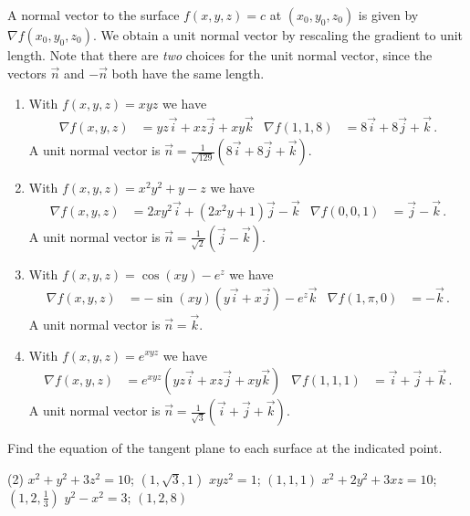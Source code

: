 \begin{solution}
A normal vector to the surface $f(x,y,z)=c$ at $(x_0,y_0,z_0)$ is given by $\nabla f(x_0,y_0,z_0)$. We obtain a unit normal vector by rescaling the gradient to unit length. Note that there are \emph{two} choices for the unit normal vector, since the vectors $\vec n$ and $-\vec n$ both have the same length.
\begin{enumerate}
\item
With $f(x,y,z) = xyz$ we have
\begin{align*}
\nabla f(x,y,z) &= yz \vec i + xz \vec j + xy \vec k &
\nabla f(1,1,8) &= 8\vec i + 8 \vec j + \vec k\,.
\end{align*}
A unit normal vector is
$\vec n = \frac{1}{\sqrt {129}} \left( 8\vec i + 8 \vec j + \vec k \right)$.

\item
With $f(x,y,z) = x^2y^2 + y -z$ we have
\begin{align*}
\nabla f(x,y,z) &= 2xy^2 \vec i + (2x^2 y + 1) \vec j - \vec k &
\nabla f(0,0,1) &= \vec j - \vec k\,.
\end{align*}
A unit normal vector is 
$\vec n = \frac{1}{\sqrt 2} \left( \vec j - \vec k \right)$.

\item
With $f(x,y,z) = \cos(xy) - e^z$ we have
\begin{align*}
\nabla f(x,y,z) &= -\sin(xy) \left(y \vec i + x \vec j\right) - e^z \vec k &
\nabla f(1,\pi,0) &= -\vec k\,.
\end{align*}
A unit normal vector is $\vec n = \vec k$.

\item
With $f(x,y,z) = e^{xyz}$ we have
\begin{align*}
\nabla f(x,y,z) &= e^{xyz} \left( yz \vec i + xz \vec j + xy \vec k \right) &
\nabla f(1,1,1) &= \vec i + \vec j + \vec k\,.
\end{align*}
A unit normal vector is $\vec n = \frac 1{\sqrt{3}} \left( \vec i + \vec j + \vec k \right)$.
\end{enumerate}
\end{solution}

\begin{question}
Find the equation of the tangent plane to each surface at the indicated point.
\begin{tasks}(2)
\task
$x^2 + y^2 + 3z^2 = 10$; $\left(1, \sqrt{3}, 1\right)$
\task
$xyz^2 = 1$; $(1,1,1)$
\task
$x^2 + 2y^2 + 3xz = 10$; $\left(1, 2, \frac 13\right)$
\task
$y^2 - x^2 = 3$; $(1, 2, 8)$
\end{tasks}
\end{question}

